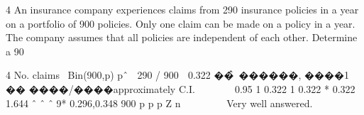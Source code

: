 \documentclass[a4paper,12pt]{article}
\begin{document}

4 An insurance company experiences claims from 290 insurance policies in a year on a portfolio of 900 policies. Only one claim can be made on a policy in a year. The company assumes that all policies are independent of each other.
Determine a 90%




  4 No. claims ~Bin(900,p)
pˆ  290 / 900  0.322
��̂~������, ����1 �� ����/����approximately
C.I.
      0.95
1 0.322 1 0.322
* 0.322 1.644
ˆ ˆ
ˆ 9* 0.296,0.348
900
p p
p Z
n
 
    
Very well answered.
\end{document}
